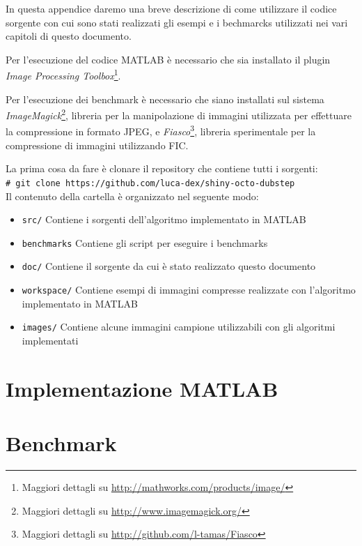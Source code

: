 \documentclass[11pt,a4paper,appendixprefix=true,numbers=noenddot]{scrreprt}
\newcommand{\shellcmd}[1]{\\\indent\indent\texttt{\footnotesize\# #1}\\}
\begin{document}
In questa appendice daremo una breve descrizione di come utilizzare il codice sorgente con cui sono stati realizzati gli esempi e i bechmarcks utilizzati nei vari capitoli di questo documento. 

Per l'esecuzione del codice MATLAB è necessario che sia installato il plugin \textit{Image Processing Toolbox}\footnote{Maggiori dettagli su \url{http://mathworks.com/products/image/}}.

Per l'esecuzione dei benchmark è necessario che siano installati sul sistema \textit{ImageMagick}\footnote{Maggiori dettagli su \url{http://www.imagemagick.org/}}, libreria per la manipolazione di immagini utilizzata per effettuare la compressione in formato JPEG, e \textit{Fiasco}\footnote{Maggiori dettagli su \url{http://github.com/l-tamas/Fiasco}}, libreria sperimentale per la compressione di immagini utilizzando FIC.

\noindent La prima cosa da fare è clonare il repository che contiene tutti i sorgenti:
\shellcmd{git clone https://github.com/luca-dex/shiny-octo-dubstep}

Il contenuto della cartella è organizzato nel seguente modo:

\begin{itemize}
\item \texttt{src/} Contiene i sorgenti dell'algoritmo implementato in MATLAB
\item \texttt{benchmarks} Contiene gli script per eseguire i benchmarks
\item \texttt{doc/} Contiene il sorgente da cui è stato realizzato questo documento
\item \texttt{workspace/} Contiene esempi di immagini compresse realizzate con l'algoritmo implementato in MATLAB
\item \texttt{images/} Contiene alcune immagini campione utilizzabili con gli algoritmi implementati
\end{itemize}

\section{Implementazione MATLAB}

\section{Benchmark}
\end{document}
